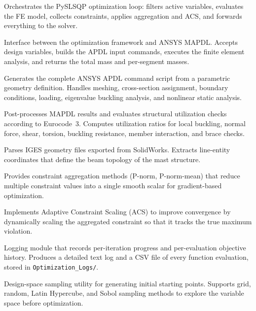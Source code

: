 \begin{description}[style=nextline, leftmargin=2.5cm]

    \item[\texttt{optimization.py}]
    Orchestrates the PySLSQP optimization loop: filters active variables, evaluates the FE model, collects constraints, applies aggregation and ACS, and forwards everything to the solver.

    \item[\texttt{MyAPDLCall.py}]
    Interface between the optimization framework and ANSYS MAPDL.
    Accepts design variables, builds the APDL input commands, executes the finite element analysis, and returns the total mass and per-segment masses.

    \item[\texttt{APDL\_Input.py}]
    Generates the complete ANSYS APDL command script from a parametric geometry definition.
    Handles meshing, cross-section assignment, boundary conditions, loading, eigenvalue buckling analysis, and nonlinear static analysis.

    \item[\texttt{Post\_Process.py}]
    Post-processes MAPDL results and evaluates structural utilization checks according to Eurocode~3.
    Computes utilization ratios for local buckling, normal force, shear, torsion, buckling resistance, member interaction, and brace checks.

    \item[\texttt{SW\_Import.py}]
    Parses IGES geometry files exported from SolidWorks.
    Extracts line-entity coordinates that define the beam topology of the mast structure.

    \item[\texttt{aggregate.py}]
    Provides constraint aggregation methods (P-norm, P-norm-mean) that reduce multiple constraint values into a single smooth scalar for gradient-based optimization.

    \item[\texttt{acs.py}]
    Implements Adaptive Constraint Scaling (ACS) to improve convergence by dynamically scaling the aggregated constraint so that it tracks the true maximum violation.

    \item[\texttt{opt\_logger.py}]
    Logging module that records per-iteration progress and per-evaluation objective history.
    Produces a detailed text log and a CSV file of every function evaluation, stored in \texttt{Optimization\_Logs/}.

    \item[\texttt{search\_space.py}]
    Design-space sampling utility for generating initial starting points.
    Supports grid, random, Latin Hypercube, and Sobol sampling methods to explore the variable space before optimization.

\end{description}

